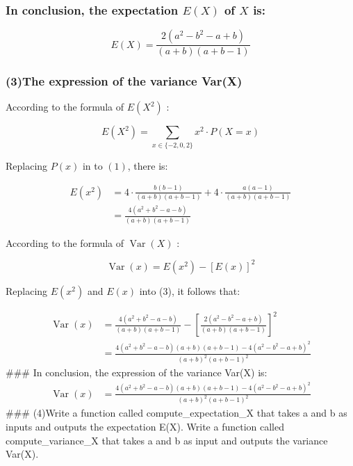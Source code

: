 \documentclass[
]{article}
\begin{document}
\subsubsection{\texorpdfstring{In conclusion, the expectation \(E(X)\)
of \(X\)
is:}{In conclusion, the expectation E(X) of X is:}}\label{in-conclusion-the-expectation-ex-of-x-is}

\[
E(X)=\frac{2\left(a^{2}-b^{2}-a+b\right)}{(a+b)(a+b-1)}
\]

\subsubsection{(3)The expression of the variance
Var(X)}\label{the-expression-of-the-variance-varx}

According to the formula of \(E\left(X^{2}\right)\) :

\[
\begin{equation*}
E\left(X^{2}\right)=\sum_{x \in\{-2,0,2\}} x^{2} \cdot P(X=x) \tag{1}
\end{equation*}
\]

Replacing \(P(x)\) in to \((1)\), there is:

\[
\begin{align*}
E\left(x^{2}\right) & =4 \cdot \frac{b(b-1)}{(a+b)(a+b-1)}+4 \cdot \frac{a(a-1)}{(a+b)(a+b-1)} \\
& =\frac{4\left(a^{2}+b^{2}-a-b\right)}{(a+b)(a+b-1)} \tag{2}
\end{align*}
\]

According to the formula of \(\operatorname{Var}(X)\) :

\[
\begin{equation*}
\operatorname{Var}(x)=E\left(x^{2}\right)-[E(x)]^{2} \tag{3}
\end{equation*}
\]

Replacing \(E\left(x^{2}\right)\) and \(E(x)\) into (3), it follows
that:

\[
\begin{aligned}
\operatorname{Var}(x) & =\frac{4\left(a^{2}+b^{2}-a-b\right)}{(a+b)(a+b-1)}-\left[\frac{2\left(a^{2}-b^{2}-a+b\right)}{(a+b)(a+b-1)}\right]^{2} \\
& =\frac{4\left(a^{2}+b^{2}-a-b\right)(a+b)(a+b-1)-4\left(a^{2}-b^{2}-a+b\right)^{2}}{(a+b)^{2}(a+b-1)^{2}}
\end{aligned}
\] \#\#\# In conclusion, the expression of the variance Var(X) is:\\
\[
\begin{aligned}
\operatorname{Var}(x) & =\frac{4\left(a^{2}+b^{2}-a-b\right)(a+b)(a+b-1)-4\left(a^{2}-b^{2}-a+b\right)^{2}}{(a+b)^{2}(a+b-1)^{2}}
\end{aligned}
\] \#\#\# (4)Write a function called compute\_expectation\_X that takes
a and b as inputs and outputs the expectation E(X). Write a function
called compute\_variance\_X that takes a and b as input and outputs the
variance Var(X).
\end{document}
